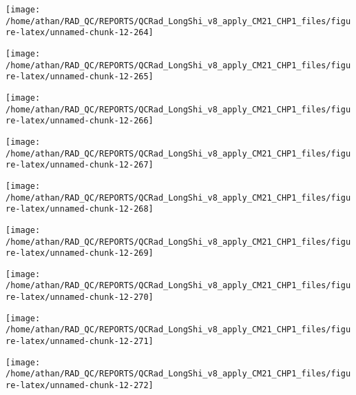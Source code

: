 \documentclass[
  10pt,
  a4paper,oneside]{article}
\begin{document}
\begin{center}\texttt{[image: /home/athan/RAD\_QC/REPORTS/QCRad\_LongShi\_v8\_apply\_CM21\_CHP1\_files/figure-latex/unnamed-chunk-12-264]} \end{center}

\begin{center}\texttt{[image: /home/athan/RAD\_QC/REPORTS/QCRad\_LongShi\_v8\_apply\_CM21\_CHP1\_files/figure-latex/unnamed-chunk-12-265]} \end{center}

\begin{center}\texttt{[image: /home/athan/RAD\_QC/REPORTS/QCRad\_LongShi\_v8\_apply\_CM21\_CHP1\_files/figure-latex/unnamed-chunk-12-266]} \end{center}

\begin{center}\texttt{[image: /home/athan/RAD\_QC/REPORTS/QCRad\_LongShi\_v8\_apply\_CM21\_CHP1\_files/figure-latex/unnamed-chunk-12-267]} \end{center}

\begin{center}\texttt{[image: /home/athan/RAD\_QC/REPORTS/QCRad\_LongShi\_v8\_apply\_CM21\_CHP1\_files/figure-latex/unnamed-chunk-12-268]} \end{center}

\begin{center}\texttt{[image: /home/athan/RAD\_QC/REPORTS/QCRad\_LongShi\_v8\_apply\_CM21\_CHP1\_files/figure-latex/unnamed-chunk-12-269]} \end{center}

\begin{center}\texttt{[image: /home/athan/RAD\_QC/REPORTS/QCRad\_LongShi\_v8\_apply\_CM21\_CHP1\_files/figure-latex/unnamed-chunk-12-270]} \end{center}

\begin{center}\texttt{[image: /home/athan/RAD\_QC/REPORTS/QCRad\_LongShi\_v8\_apply\_CM21\_CHP1\_files/figure-latex/unnamed-chunk-12-271]} \end{center}

\begin{center}\texttt{[image: /home/athan/RAD\_QC/REPORTS/QCRad\_LongShi\_v8\_apply\_CM21\_CHP1\_files/figure-latex/unnamed-chunk-12-272]} \end{center}
\end{document}
